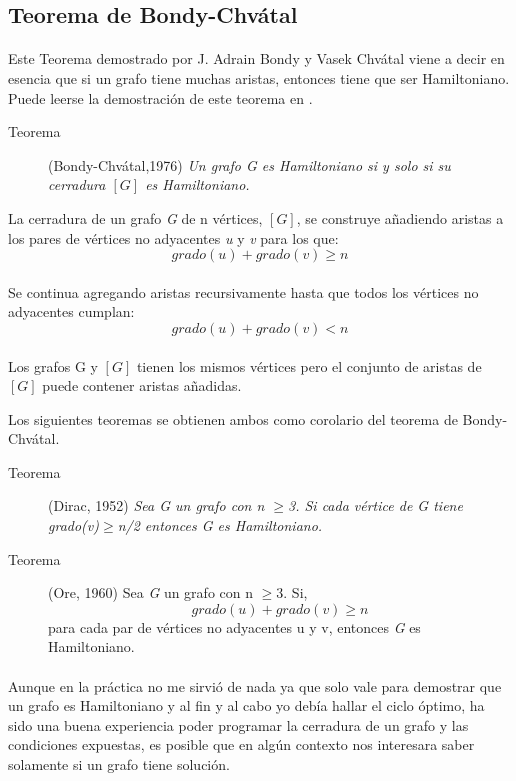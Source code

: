 \documentclass[es]{ifirak}
\begin{document}
	\subsection{Teorema de Bondy-Chvátal}
	\large{
		\paragraph{}
		Este Teorema demostrado por J. Adrain Bondy y Vasek Chvátal viene a decir en esencia que si un grafo tiene muchas aristas, entonces tiene que ser Hamiltoniano. Puede leerse la demostración de este teorema en \cite{key-5}. 
		\begin{description}
			\item[Teorema] (Bondy-Chvátal,1976) \textit{Un grafo \textit{G} es Hamiltoniano si y solo si su cerradura $[G]$ es Hamiltoniano.}
		\end{description}
		
		La cerradura de un grafo \textit{G} de n vértices, $[G]$, se construye añadiendo aristas a los pares de vértices no adyacentes \textit{u} y \textit{v} para los que:
		$$ grado(u) + grado(v) \geq n$$
		\paragraph{}
		Se continua agregando aristas recursivamente hasta que todos los vértices no adyacentes cumplan:
		$$ grado(u) + grado(v) < n$$
		\paragraph{}	
		Los grafos G y $[G]$ tienen los mismos vértices pero el conjunto de aristas de $[G]$ puede contener aristas añadidas.
		
		Los siguientes teoremas se obtienen ambos como corolario del teorema de Bondy-Chvátal. 
		\begin{description}
			\item[Teorema] (Dirac, 1952) \textit{Sea \textit{G} un grafo con n $\geq$3. Si cada vértice de G tiene grado(v)$\geq$n/2 entonces \textit{G} es Hamiltoniano.}
			\item[Teorema] (Ore, 1960) Sea \textit{G} un grafo con n $\geq$3. Si,
			$$ grado(u) + grado(v) \geq n$$ para cada par de vértices no adyacentes u y v, entonces \textit{G} es Hamiltoniano.
		\end{description}
		\paragraph{}
		Aunque en la práctica no me sirvió de nada ya que solo vale para demostrar que un grafo es Hamiltoniano y al fin y al cabo yo debía hallar el ciclo óptimo, ha sido una buena experiencia poder programar la cerradura de un grafo y las condiciones expuestas, es posible que en algún contexto nos interesara saber solamente si un grafo tiene solución.
	}
	
\end{document}
